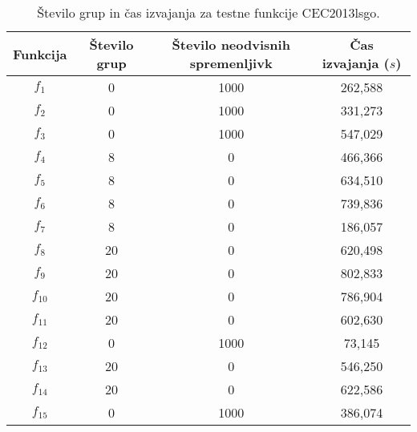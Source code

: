 \begin{table}[t]
    \renewcommand{\arraystretch}{1.3}
    \centering
    \caption{Število grup in čas izvajanja za testne funkcije CEC2013lsgo.} \label{tab:bech:func_basic_stats}
    \begin{tabular}{|c|c|c|c|}
        \hline
        Funkcija & Število grup & Število neodvisnih spremenljivk & Čas izvajanja ($s$) \\\hline
        $f_1$    & 0  & 1000 & 262,588 \\\hline
        $f_2$    & 0  & 1000 & 331,273 \\\hline
        $f_3$    & 0  & 1000 & 547,029 \\\hline
        $f_4$    & 8  & 0    & 466,366 \\\hline
        $f_5$    & 8  & 0    & 634,510 \\\hline
        $f_6$    & 8  & 0    & 739,836 \\\hline
        $f_7$    & 8  & 0    & 186,057 \\\hline
        $f_8$    & 20 & 0    & 620,498 \\\hline
        $f_9$    & 20 & 0    & 802,833 \\\hline
        $f_{10}$ & 20 & 0    & 786,904 \\\hline
        $f_{11}$ & 20 & 0    & 602,630 \\\hline
        $f_{12}$ & 0  & 1000 & 73,145  \\\hline
        $f_{13}$ & 20 & 0    & 546,250 \\\hline
        $f_{14}$ & 20 & 0    & 622,586 \\\hline
        $f_{15}$ & 0  & 1000 & 386,074 \\\hline
    \end{tabular}
\end{table}

